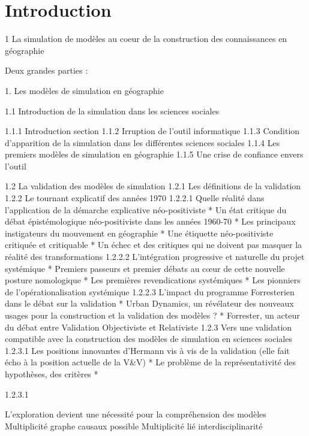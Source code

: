 
\chapter{Introduction}

\startcontents[chapters]
\Mprintcontents


1 La simulation de modèles au coeur de la construction des connaissances en géographie

Deux grandes parties : 

1. Les modèles de simulation en géographie

1.1 Introduction de la simulation dans les sciences sociales 
	
	1.1.1 Introduction section
	1.1.2 Irruption de l'outil informatique
	1.1.3 Condition d'apparition de la simulation dans les différentes sciences sociales
	1.1.4 Les premiers modèles de simulation en géographie
	1.1.5 Une crise de confiance envers l'outil

1.2 La validation des modèles de simulation
	1.2.1 Les définitions de la validation
	1.2.2 Le tournant explicatif des années 1970
		1.2.2.1 Quelle réalité dans l'application de la démarche explicative néo-positiviste
			* Un état critique du débat épistémologique néo-positiviste dans les années 1960-70
			* Les principaux instigateurs du mouvement en géographie
			* Une étiquette néo-positiviste critiquée et critiquable
			* Un échec et des critiques qui ne doivent pas masquer la réalité des transformations
		1.2.2.2 L'intégration progressive et naturelle du projet systémique
			* Premiers passeurs et premier débats au cœur de cette nouvelle posture nomologique
			* Les premières revendications systémiques
			* Les pionniers de l'opérationalisation systémique
		1.2.2.3 L'impact du programme Forresterien dans le débat sur la validation
			* Urban Dynamics, un révélateur des nouveaux usages pour la construction et la validation des modèles ?
			* Forrester, un acteur du débat entre Validation Objectiviste et Relativiste
	1.2.3 Vers une validation compatible avec la construction des modèles de simulation en sciences sociales
			1.2.3.1 Les positions innovantes d'Hermann vis à vis de la validation
				(elle fait écho à la position actuelle de la V\&V)
			* Le problème de la représentativité des hypothèses, des critères
			* 

		1.2.3.1 

L'exploration devient une nécessité pour la compréhension des modèles
	Multiplicité graphe causaux possible
	Multiplicité lié interdisciplinarité

